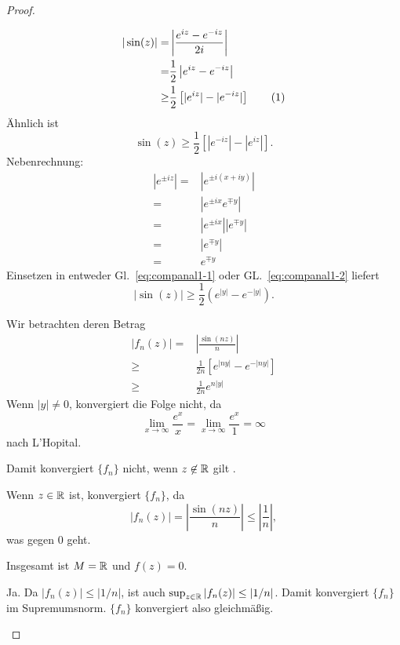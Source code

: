\begin{proof}
	\begin{parts}
	\item 
		\begin{align*}
			|\sin(z)|=& \left| \frac{e^{iz}-e^{-iz}}{2i} \right| \\
			=&\frac{1}{2}\left| e^{iz}-e^{-iz} \right| \\
			\ge&\frac{1}{2}\left[ |e^{iz}|-|e^{-iz}| \right] \addtocounter{equation}{1}\tag{\theequation}\label{eq:companal1-1} 
		\end{align*}
		Ähnlich ist
		\begin{equation}
			\sin(z)\ge \frac{1}{2}\left[ |e^{-iz}|-|e^{iz}| \right] \label{eq:companal1-2}
		.\end{equation}
		Nebenrechnung:
		\begin{align*}
			|e^{\pm iz}|=&|e^{\pm i(x+iy)}|\\
			=&|e^{\pm ix}e^{\mp y}|\\
			=&|e^{\pm ix}| |e^{\mp y}|\\
			=&|e^{\mp y}|\\
			=&e^{\mp y}
		\end{align*}
		Einsetzen in entweder Gl.~\eqref{eq:companal1-1} oder GL.~\eqref{eq:companal1-2} liefert
		\begin{equation}
			|\sin(z)| \ge \frac{1}{2}\left( e^{|y|}-e^{-|y|} \right)\label{eq:companal1-3} 
		.\end{equation}
	\item Wir betrachten deren Betrag
		\begin{align*}
			|f_n(z)|=&\left| \frac{\sin(nz)}{n} \right| \\
			\ge& \frac{1}{2n}[e^{|n y|}-e^{-|ny|}]\\
			\ge& \frac{1}{2n}e^{n|y|}
		\end{align*}
Wenn $|y|\neq 0$, konvergiert die Folge nicht, da
\[
\lim_{x \to \infty} \frac{e^x}{x}=\lim_{x \to \infty} \frac{e^x}{1}=\infty
\]
nach L'Hopital. 

Damit konvergiert $\{f_n\} $ nicht, wenn $z \not\in \mathbb{R}$ gilt .

Wenn $z\in \mathbb{R}$ ist, konvergiert $\{f_n\} $, da
\[
|f_n(z)|= \left| \frac{\sin (nz)}{n} \right| \le \left| \frac{1}{n} \right| 
,\]
was gegen $0$ geht.

Insgesamt ist $M=\mathbb{R}$ und $f(z)=0$. 
\item Ja. Da $|f_n(z)|\le |1 / n|$, ist auch $\sup_{z\in \mathbb{R}}|f_n(z)|\le |1 / n|$. Damit konvergiert $\{f_n\} $ im Supremumsnorm. $\{f_n\} $ konvergiert also gleichmäßig.\qedhere 
	\end{parts}
\end{proof}
